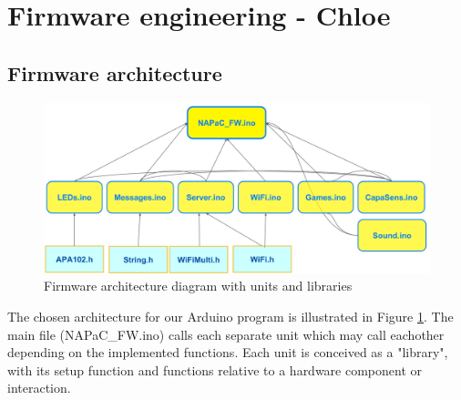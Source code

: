\newpage
\section{Firmware engineering - Chloe }
\label{sec:fw}


\subsection{Firmware architecture}

\begin{figure}[ht]
    \centering
    \includegraphics[width=\textwidth]{images/FW/FW_architecture.PNG}
    \caption{Firmware architecture diagram with units and libraries}
    \label{fig:FW_architecture}
\end{figure}

The chosen architecture for our Arduino program is illustrated in Figure \ref{fig:FW_architecture}. The main file (NAPaC\_FW.ino) calls each separate unit which may call eachother depending on the implemented functions.
Each unit is conceived as a "library", with its setup function and functions relative to a hardware component or interaction.

